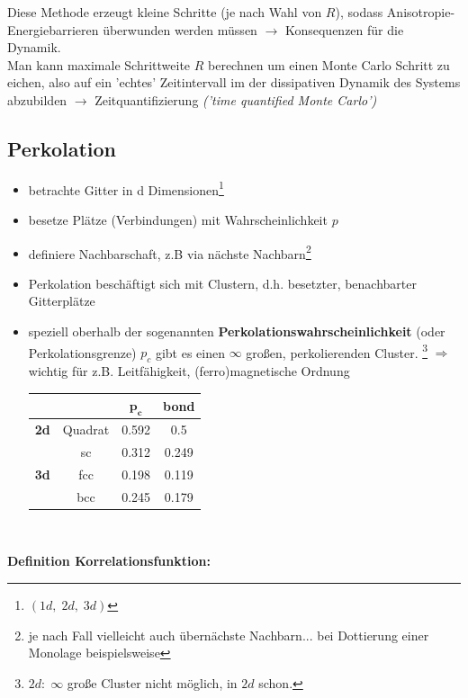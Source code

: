 \documentclass[12pt]{article}
\begin{document}
\begin{enumerate}
			
Diese Methode erzeugt kleine Schritte (je nach Wahl von $R$), sodass Anisotropie-Energiebarrieren überwunden werden müssen $\to$ Konsequenzen für die Dynamik.  \\
Man kann maximale Schrittweite $R$ berechnen um einen Monte Carlo Schritt zu eichen, also auf ein 'echtes' Zeitintervall im %
der dissipativen Dynamik des Systems abzubilden $\to$ Zeitquantifizierung \textit{('time quantified Monte Carlo')}		
\end{enumerate}


 \subsection{Perkolation}
 	\begin{itemize}
 	\item betrachte Gitter in d Dimensionen\footnote{$(1d, \; 2d, \; 3d)$}
 	\item besetze Plätze (Verbindungen) mit Wahrscheinlichkeit $p$
 	\item definiere Nachbarschaft, z.B via nächste Nachbarn\footnote{je nach Fall vielleicht auch übernächste Nachbarn... bei Dottierung einer Monolage beispielsweise}
 	\item Perkolation beschäftigt sich mit Clustern, d.h.  besetzter, benachbarter Gitterplätze %
 	\item speziell oberhalb der sogenannten \textbf{Perkolationswahrscheinlichkeit} (oder Perkolationsgrenze) $p_c$ gibt es einen $\infty$ großen, perkolierenden Cluster. \footnote{$2d: \; \infty $ große Cluster  nicht möglich, in $2d$ schon.}
 	$\Rightarrow$ wichtig für z.B. Leitfähigkeit, (ferro)magnetische Ordnung 
 	\begin{center}
 	
 	
 	\begin{tabular}{c||c c c}
 	 &  & $\mathbf{p_c}$ &\textbf{ bond} \\ 
 	\hline 
 	\textbf{2d} & Quadrat & 0.592 & 0.5 \\ 
 	 & sc & 0.312 & 0.249 \\ 
 	\textbf{3d} & fcc & 0.198 & 0.119 \\ 
 	 & bcc & 0.245 & 0.179 \\ 
 	\end{tabular} \\
 	\end{center} 
 	\end{itemize}
 	\textbf{Definition Korrelationsfunktion:}\\
 	
\end{document}
